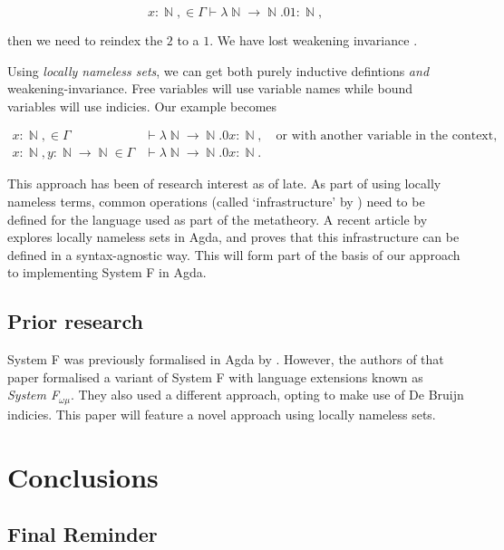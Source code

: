 \documentclass[logo,bsc,singlespacing,parskip,online]{infthesis}
\DeclareMathOperator{\nat}{\mathbb{N}}
\begin{document}
\begin{equation*}
  x \colon \nat, \in \Gamma \vdash \lambda \nat \to \nat. 0 1 \colon \nat,
\end{equation*}

then we need to reindex the $2$ to a $1$. We have lost weakening invariance
\citep{aydemir_engineering_2008}.

Using \textit{locally nameless sets}, we can get both purely inductive
defintions \textit{and} weakening-invariance. Free variables will use variable
names while bound variables will use indicies. Our example becomes

\begin{align*}
  x \colon \nat, \in \Gamma &\vdash \lambda \nat \to \nat. 0 x \colon \nat,\quad \text{or with another variable in the context,}\\
  x \colon \nat, y \colon \nat \to \nat \in \Gamma &\vdash \lambda \nat \to \nat. 0 x \colon \nat.
\end{align*}

This approach has been of research interest as of late. As part of using locally
nameless terms, common operations (called `infrastructure' by
\citet{aydemir_engineering_2008}) need to be defined for the language used as
part of the metatheory. A recent article by \citet{pitts_locally_2023} explores
locally nameless sets in Agda, and proves that this infrastructure can be
defined in a syntax-agnostic way. This will form part of the basis of our
approach to implementing System F in Agda.

\section{Prior research}
System F was previously formalised in Agda by \citet{hutton_system_2019}.
However, the authors of that paper formalised a variant of System F with
language extensions known as \textit{System F$_{\omega \mu}$}. They also used a
different approach, opting to make use of De Bruijn indicies. This paper will
feature a novel approach using locally nameless sets.

\chapter{Conclusions}

\section{Final Reminder}
\end{document}
